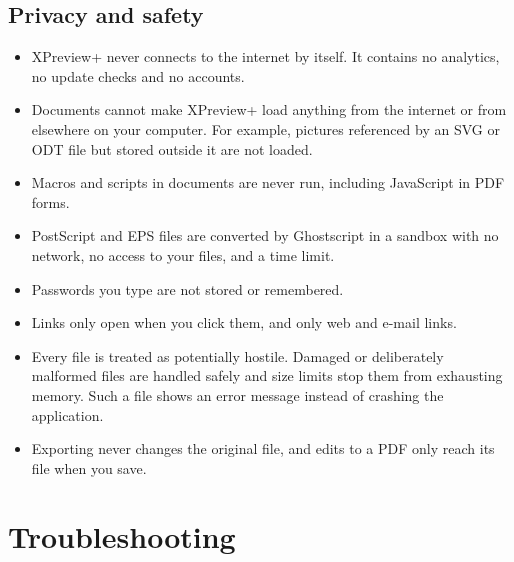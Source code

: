 \documentclass[11pt,a4paper]{article}
\newcommand{\app}{XPreview+}
\begin{document}
\subsection{Privacy and safety}
\begin{itemize}
  \item \app{} never connects to the internet by itself. It contains no analytics, no update
        checks and no accounts.
  \item Documents cannot make \app{} load anything from the internet or from elsewhere on
        your computer. For example, pictures referenced by an SVG or ODT file but stored
        outside it are not loaded.
  \item Macros and scripts in documents are never run, including JavaScript in PDF forms.
  \item PostScript and EPS files are converted by Ghostscript in a sandbox with no network,
        no access to your files, and a time limit.
  \item Passwords you type are not stored or remembered.
  \item Links only open when you click them, and only web and e-mail links.
  \item Every file is treated as potentially hostile. Damaged or deliberately malformed files
        are handled safely and size limits stop them from exhausting memory. Such
        a file shows an error message instead of crashing the application.
  \item Exporting never changes the original file, and edits to a PDF only reach its file
        when you save.
\end{itemize}

\section{Troubleshooting}
\end{document}
